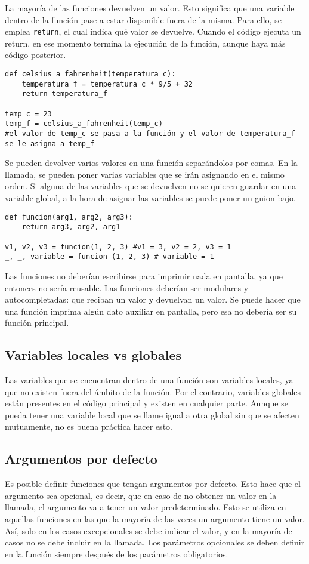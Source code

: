 La mayoría de las funciones devuelven un valor. Esto significa que una variable dentro de la función pase a estar disponible fuera de la misma. Para ello, se emplea \texttt{return}, el cual indica qué valor se devuelve. Cuando el código ejecuta un return, en ese momento termina la ejecución de la función, aunque haya más código posterior.
\begin{lstlisting}
def celsius_a_fahrenheit(temperatura_c):
	temperatura_f = temperatura_c * 9/5 + 32
	return temperatura_f
	
temp_c = 23
temp_f = celsius_a_fahrenheit(temp_c) 
#el valor de temp_c se pasa a la función y el valor de temperatura_f se le asigna a temp_f
\end{lstlisting}
Se pueden devolver varios valores en una función separándolos por comas. En la llamada, se pueden poner varias variables que se irán asignando en el mismo orden. Si alguna de las variables que se devuelven no se quieren guardar en una variable global, a la hora de asignar las variables se puede poner un guion bajo.
\begin{lstlisting}
def funcion(arg1, arg2, arg3):
	return arg3, arg2, arg1 
	
v1, v2, v3 = funcion(1, 2, 3) #v1 = 3, v2 = 2, v3 = 1
_, _, variable = funcion (1, 2, 3) # variable = 1
\end{lstlisting}
Las funciones no deberían escribirse para imprimir nada en pantalla, ya que entonces no sería reusable. Las funciones deberían ser modulares y autocompletadas: que reciban un valor y devuelvan un valor. Se puede hacer que una función imprima algún dato auxiliar en pantalla, pero esa no debería ser su función principal.

\subsection{Variables locales vs globales}
Las variables que se encuentran dentro de una función son variables locales, ya que no existen fuera del ámbito de la función. Por el contrario, variables globales están presentes en el código principal y existen en cualquier parte. Aunque se pueda tener una variable local que se llame igual a otra global sin que se afecten mutuamente, no es buena práctica hacer esto.

\subsection{Argumentos por defecto}
Es posible definir funciones que tengan argumentos por defecto. Esto hace que el argumento sea opcional, es decir, que en caso de no obtener un valor en la llamada, el argumento va a tener un valor predeterminado. Esto se utiliza en aquellas funciones en las que la mayoría de las veces un argumento tiene un valor. Así, solo en los casos excepcionales se debe indicar el valor, y en la mayoría de casos no se debe incluir en la llamada. Los parámetros opcionales se deben definir en la función siempre después de los parámetros obligatorios. 

